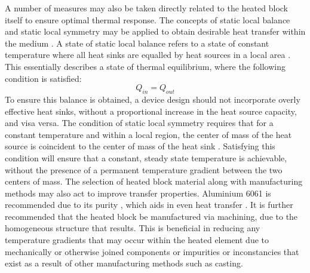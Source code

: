 A number of measures may also be taken directly related to the heated block itself to ensure optimal thermal response. The concepts of static local balance and static local symmetry may be applied to obtain desirable heat transfer within the medium \cite{7238517}. A state of static local balance refers to a state of constant temperature where all heat sinks are equalled by heat sources in a local area \cite{7238517}. This essentially describes a state of thermal equilibrium, where the following condition is satisfied:
\begin{equation}
Q_{in} = Q_{out}
\end{equation}
To ensure this balance is obtained, a device design should not incorporate overly effective heat sinks, without a proportional increase in the heat source capacity, and visa versa. The condition of static local symmetry requires that for a constant temperature and within a local region, the center of mass of the heat source is coincident to the center of mass of the heat sink \cite{7238517}. Satisfying this condition will ensure that a constant, steady state temperature is achievable, without the presence of a permanent temperature gradient between the two centers of mass. The selection of heated block material along with manufacturing methods may also act to improve transfer properties. Aluminium 6061 is recommended due to its purity \cite{7238517}, which aids in even heat transfer \cite{OLAFSSON1997}. It is further recommended that the heated block be manufactured via machining, due to the homogeneous structure that results. This is beneficial in reducing any temperature gradients that may occur within the heated element due to mechanically or otherwise joined components or impurities or inconstancies that exist as a result of other manufacturing methods such as casting.\\

